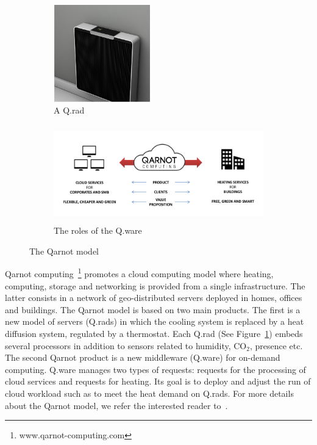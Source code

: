 \documentclass[10pt, conference, compsocconf]{IEEEtran}
\begin{document}
	\begin{figure}[htbp]
          \begin{subfigure}[b]{0.4\textwidth}
            \centering
            \includegraphics[width=4.2cm,height=4.2cm]{./Figures/rad.png}
            \caption{\scriptsize A Q.rad }
          \end{subfigure}
          \begin{subfigure}[b]{0.4\textwidth}
            \centering
            \includegraphics[width=10.7cm,height=4.2cm]{./Figures/model.png}
            \caption{\scriptsize The roles of the Q.ware }
          \end{subfigure}
	\caption{The Qarnot model}
	\label{fig:digital}
	\end{figure}


Qarnot computing~\footnote{www.qarnot-computing.com} promotes a cloud computing model where heating, computing, 
storage and networking is provided from a 
single infrastructure. The latter consists in a network of geo-distributed servers deployed in homes, offices and buildings. 
The Qarnot model is based on two main products. The first is a new model of servers (Q.rads) in which the cooling system is replaced by a 
heat diffusion system, regulated by a thermostat. Each Q.rad (See Figure~\ref{fig:digital}) embeds several processors in addition to sensors 
related to humidity, $\mathrm{CO_2}$, presence etc. The second Qarnot product is a new middleware (Q.ware) for on-demand computing. Q.ware manages 
two types of requests: requests for the processing of cloud services  and requests for heating. Its goal is to deploy and 
adjust the run of cloud workload such as to meet the heat demand on Q.rads. For more details about the Qarnot model, we refer the interested 
reader to~\cite{DBLP:conf/europar/Ngoko16}. 
\end{document}
